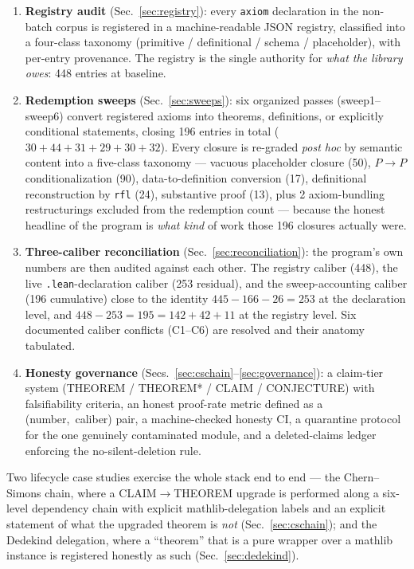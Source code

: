\begin{enumerate}
\item \textbf{Registry audit} (Sec.~\ref{sec:registry}): every
\texttt{axiom} declaration in the non-batch corpus is registered in a
machine-readable JSON registry, classified into a four-class taxonomy
(primitive / definitional / schema / placeholder), with per-entry
provenance. The registry is the single authority for \emph{what the
library owes}: 448 entries at baseline.
\item \textbf{Redemption sweeps} (Sec.~\ref{sec:sweeps}): six
organized passes (sweep1--sweep6) convert registered axioms into
theorems, definitions, or explicitly conditional statements, closing
196 entries in total ($30+44+31+29+30+32$). Every closure is
re-graded \emph{post hoc} by semantic content into a five-class
taxonomy --- vacuous placeholder closure (50), $P\!\to\!P$
conditionalization (90), data-to-definition conversion (17),
definitional reconstruction by \texttt{rfl} (24), substantive proof
(13), plus 2 axiom-bundling restructurings excluded from the
redemption count --- because the honest headline of the program is
\emph{what kind} of work those 196 closures actually were.
\item \textbf{Three-caliber reconciliation}
(Sec.~\ref{sec:reconciliation}): the program's own numbers are then
audited against each other. The registry caliber (448), the live
\texttt{.lean}-declaration caliber (253 residual), and the
sweep-accounting caliber (196 cumulative) close to the identity
$445 - 166 - 26 = 253$ at the declaration level, and
$448 - 253 = 195 = 142 + 42 + 11$ at the registry level. Six
documented caliber conflicts (C1--C6) are resolved and their
anatomy tabulated.
\item \textbf{Honesty governance}
(Secs.~\ref{sec:cschain}--\ref{sec:governance}): a claim-tier system
(THEOREM / THEOREM* / CLAIM / CONJECTURE) with falsifiability
criteria, an honest proof-rate metric defined as a
(number,~caliber) pair, a machine-checked honesty CI, a quarantine
protocol for the one genuinely contaminated module, and a
deleted-claims ledger enforcing the no-silent-deletion rule.
\end{enumerate}

Two lifecycle case studies exercise the whole stack end to end ---
the Chern--Simons chain, where a CLAIM$\to$THEOREM upgrade is
performed along a six-level dependency chain with explicit
mathlib-delegation labels and an explicit statement of what the
upgraded theorem is \emph{not} (Sec.~\ref{sec:cschain}); and the
Dedekind delegation, where a ``theorem'' that is a pure wrapper over
a mathlib instance is registered honestly as such
(Sec.~\ref{sec:dedekind}).

